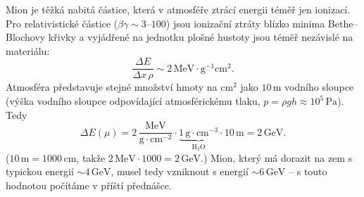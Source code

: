 \begin{priklad}
Mion je těžká nabitá částice, která v atmosféře ztrácí energii téměř jen
ionizací. Pro relativistické částice (\(\beta\gamma \sim 3\)–\(100\)) jsou
ionizační ztráty blízko minima Bethe–Blochovy křivky a vyjádřené na
jednotku plošné hustoty jsou téměř nezávislé na materiálu:
\[
  \frac{\Delta E}{\Delta x\,\rho} \sim 2\,\text{MeV}\cdot\text{g}^{-1}\text{cm}^2 .
\]
Atmosféra představuje stejné množství hmoty na \(\text{cm}^2\) jako
\(10\,\text{m}\) vodního sloupce (výška vodního sloupce odpovídající
atmosférickému tlaku, \(p = \rho g h \approx 10^5\,\text{Pa}\)). Tedy
\[
  \Delta E(\mu) = 2\,\frac{\text{MeV}}{\text{g}\cdot\text{cm}^{-2}}
  \cdot \underbrace{1\,\text{g}\cdot\text{cm}^{-3}}_{\mathrm{H_2O}}
  \cdot 10\,\text{m} = 2\,\text{GeV}.
\]
(\(10\,\text{m} = 1000\,\text{cm}\), takže
\(2\,\text{MeV}\cdot 1000 = 2\,\text{GeV}\).) Mion, který má dorazit na zem
s typickou energií \(\sim 4\,\text{GeV}\), musel tedy vzniknout s energií
\(\sim 6\,\text{GeV}\) – s touto hodnotou počítáme v příští přednášce.
\end{priklad}
